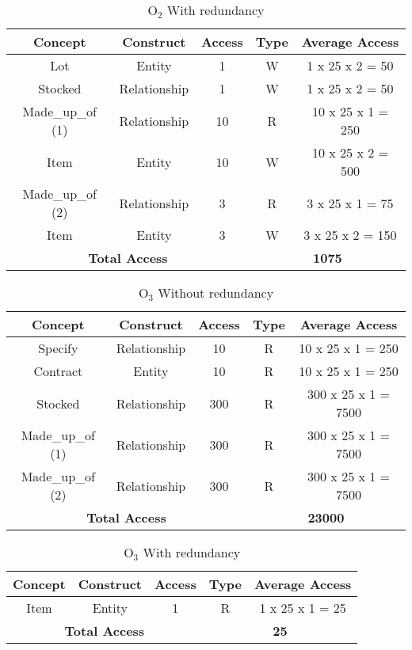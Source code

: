\begin{table}[!h]\caption{	$ \textrm{O}_\textrm{2} $ With redundancy}
	\begin{center}
		\begin{tabular}{| c | c | c | c | c |}
			\hline
			\textbf{Concept} & \textbf{Construct} & \textbf{Access} & \textbf{Type} & \textbf{Average Access} \\ \hline
			Lot & Entity & 1 & W & 1 x 25 x 2 = 50 \\ \hline
			Stocked & Relationship & 1 & W & 1 x 25 x 2 = 50 \\ \hline
			Made\_up\_of (1) & Relationship & 10 & R & 10 x 25 x 1 = 250 \\ \hline
			Item & Entity & 10 & W & 10 x 25 x 2 = 500 \\ \hline
			Made\_up\_of (2) & Relationship & 3 & R & 3 x 25 x 1 = 75 \\ \hline
			Item & Entity & 3 & W & 3 x 25 x 2 = 150 \\ \hline
			\multicolumn{3}{|c|}{\textbf{Total Access}} & \multicolumn{2}{|c|}{\textbf{1075}} \\ \hline
		\end{tabular}
	\end{center}
\end{table}
\begin{table}[!h]\caption{	$ \textrm{O}_\textrm{3} $ Without redundancy }
	\begin{center}
		\begin{tabular}{| c | c | c | c | c |}
			\hline
			\textbf{Concept} & \textbf{Construct} & \textbf{Access} & \textbf{Type} & \textbf{Average Access} \\ \hline
			Specify & Relationship & 10 & R & 10 x 25 x 1 = 250 \\ \hline
			Contract & Entity & 10 & R & 10 x 25 x 1 = 250 \\ \hline
			Stocked & Relationship & 300 & R & 300 x 25 x 1 = 7500 \\ \hline
            Made\_up\_of (1) & Relationship & 300 & R & 300 x 25 x 1 = 7500 \\ \hline
            Made\_up\_of (2) & Relationship & 300 & R & 300 x 25 x 1 = 7500 \\ \hline
			\multicolumn{3}{|c|}{\textbf{Total Access}} & \multicolumn{2}{|c|}{\textbf{23000}} \\ \hline
		\end{tabular}
	\end{center}
\end{table}
\begin{table}[!h]\caption{	$ \textrm{O}_\textrm{3} $ With redundancy }
	\begin{center}
		\begin{tabular}{| c | c | c | c | c |}
			\hline
			\textbf{Concept} & \textbf{Construct} & \textbf{Access} & \textbf{Type} & \textbf{Average Access} \\ \hline
			Item & Entity & 1 & R & 1 x 25 x 1 = 25 \\ \hline
			\multicolumn{3}{|c|}{\textbf{Total Access}} & \multicolumn{2}{|c|}{\textbf{25}} \\ \hline
		\end{tabular}
	\end{center}
\end{table}
